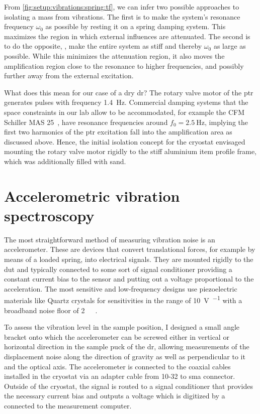 From \cref{fig:setup:vibrations:spring:tf}, we can infer two possible approaches to isolating a mass from vibrations.
The first is to make the system's resonance frequency $\omega_0$ as possible by resting it on a spring damping system.
This maximizes the region in which external influences are attenuated.
The second is to do the opposite, \ie, make the entire system as stiff and thereby $\omega_0$ as large as possible.
While this minimizes the attenuation region, it also moves the amplification region close to the resonance to higher frequencies, and possibly further away from the external excitation.

What does this mean for our case of a dry \gls{dr}?
The rotary valve motor of the \gls{ptr} generates pulses with frequency \qty{1.4}{\hertz}.
Commercial damping systems that the space constraints in our lab allow to be accommodated, for example the CFM Schiller MAS 25~\cite{CFMSchiller}, have resonance frequencies around $f_0 = \qty{2.5}{\hertz}$, implying the first two harmonics of the \gls{ptr} excitation fall into the amplification area as discussed above.
Hence, the initial isolation concept for the cryostat envisaged mounting the rotary valve motor rigidly to the stiff aluminium item profile frame, which was additionally filled with sand.

\section{Accelerometric vibration spectroscopy}\label{sec:setup:vibrations:accel}
The most straightforward method of measuring vibration noise is an accelerometer.
These are devices that convert translational forces, for example by means of a loaded spring, into electrical signals.
They are mounted rigidly to the \gls{dut} and typically connected to some sort of signal conditioner providing a constant current bias to the sensor and putting out a voltage proportional to the acceleration.
The most sensitive and low-frequency designs use piezoelectric materials like Quartz crystals for sensitivities in the range of \qty{10}{\volt\per\gaccel} with a broadband noise floor of \qty{2}{\micro\gaccel}~.

To assess the vibration level in the sample position, I designed a small angle bracket onto which the accelerometer
can be screwed either in vertical or horizontal direction in the sample puck of the \gls{dr}, allowing measurements of the displacement noise along the direction of gravity as well as perpendicular to it and the optical axis.
The accelerometer is connected to the coaxial cables installed in the cryostat via an adapter cable from 10-32 to \gls{sma} connector.
Outside of the cryostat, the signal is routed to a signal conditioner that provides the necessary current bias and outputs a voltage which is digitized by a \dmm connected to the measurement computer.

